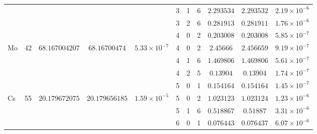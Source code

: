 \begin{table}[!htbp]
\begin{tabular}{@{}l c ccc ccc ccc@{}}
         &  &  &  &  & 3 & 1 & 6 & $2.293534$ & $2.293532$ & $2.19 \times 10^{-6}$ \\
         &  &  &  &  & 3 & 2 & 6 & $0.281913$ & $0.281911$ & $1.76 \times 10^{-6}$ \\
         &  &  &  &  & 4 & 0 & 2 & $0.203008$ & $0.203008$ & $5.85 \times 10^{-7}$ \\
        \multirow[t]{4}{*}{Mo} & \multirow[t]{4}{*}{42} & \multirow[t]{4}{*}{$68.167004207$} & \multirow[t]{4}{*}{$68.16700474$} & \multirow[t]{4}{*}{$5.33 \times 10^{-7}$} & 4 & 0 & 2 & $2.45666$ & $2.456659$ & $9.19 \times 10^{-7}$ \\
         &  &  &  &  & 4 & 1 & 6 & $1.469806$ & $1.469806$ & $5.61 \times 10^{-7}$ \\
         &  &  &  &  & 4 & 2 & 5 & $0.13904$ & $0.13904$ & $1.74 \times 10^{-7}$ \\
         &  &  &  &  & 5 & 0 & 1 & $0.154164$ & $0.154164$ & $1.45 \times 10^{-7}$ \\
        \multirow[t]{3}{*}{Cs} & \multirow[t]{3}{*}{55} & \multirow[t]{3}{*}{$20.179672075$} & \multirow[t]{3}{*}{$20.179656185$} & \multirow[t]{3}{*}{$1.59 \times 10^{-5}$} & 5 & 0 & 2 & $1.023123$ & $1.023124$ & $1.23 \times 10^{-6}$ \\
         &  &  &  &  & 5 & 1 & 6 & $0.518867$ & $0.51887$ & $3.31 \times 10^{-6}$ \\
         &  &  &  &  & 6 & 0 & 1 & $0.076443$ & $0.076437$ & $6.07 \times 10^{-6}$ \\
        \bottomrule
    \end{tabular}
\end{table}

